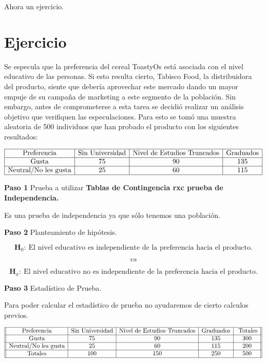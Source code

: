 \documentclass[
  a4paper,
  oneside,
  openany]{book}
\begin{document}
Ahora un ejercicio.

\hypertarget{ejercicio}{%
\section{Ejercicio}\label{ejercicio}}

Se especula que la preferencia del cereal ToastyOs está asociada con el nivel educativo de las
personas. Si esto resulta cierto, Tabisco Food, la distribuidora del producto, siente que debería
aprovechar este mercado dando un mayor empuje de su campaña de marketing a este segmento
de la población. Sin embargo, antes de comprometerse a esta tarea se decidió realizar un análisis
objetivo que verifiquen las especulaciones. Para esto se tomó una muestra aleatoria de 500
individuos que han probado el producto con los siguientes resultados:

\[
\begin{array}{|c|c|c|c|} 
\hline
\mbox{Preferencia}& \mbox{Sin Universidad}&\mbox{Nivel de Estudios Truncados}&\mbox{Graduados}\\
\hline
\mbox{Gusta}& 75&90&135\\
\hline
\mbox{Neutral/No les gusta}& 25&60&115\\
\hline
\end {array}
\]

\textbf{Paso 1} Prueba a utilizar \textbf{Tablas de Contingencia rxc prueba de Independencia.}

Es una prueba de independencia ya que sólo tenemos una población.

\textbf{Paso 2} Planteamiento de hipótesis.

\[\textbf{H}_0: \ \mbox{El nivel educativo es independiente de la preferencia hacia el producto.}\]

\[vs\]

\[\textbf{H}_a:\ \mbox{El nivel educativo no es independiente de la preferencia hacia el producto.}\]

\textbf{Paso 3} Estadístico de Prueba.

Para poder calcular el estadístico de prueba no ayudaremos de cierto calculos previos.

\[
\begin{array}{||c| c| c |c |c||} 
\hline 
\mbox{Preferencia}& \mbox{Sin Universidad}&\mbox{Nivel de Estudios Truncados}&\mbox{Graduados} &\mbox{ Totales} \\  
 \hline
\mbox{Gusta}&75&90&135&300\\
 \hline
\mbox{Neutral/No les gusta}&25&60&115&200\\
 \hline
\mbox{Totales}&100&150&250&500\\
 \hline
\end{array}
\]
\end{document}

